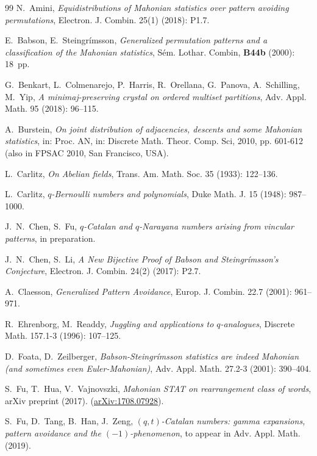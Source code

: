 \documentclass[12pt]{amsart}
\numberwithin{equation}{section}
\theoremstyle{plain}
\theoremstyle{definition}
\begin{document}
\begin{thebibliography}{99}
N.~Amini, \emph{Equidistributions of Mahonian statistics over pattern avoiding permutations}, Electron. J. Combin. 25(1) (2018): P1.7.

E.~Babson, E.~Steingr\'{i}msson, \emph{Generalized permutation patterns and a classification of the Mahonian statistics}, S\'{e}m. Lothar. Combin, {\bf B44b} (2000): 18~pp.

 G.~Benkart, L.~Colmenarejo, P.~Harris, R.~Orellana, G.~Panova, A.~Schilling, M.~Yip, \emph{A minimaj-preserving crystal on ordered multiset partitions}, Adv. Appl. Math. 95 (2018): 96--115.

A.~Burstein, \emph{On joint distribution of adjacencies, descents and some Mahonian statistics}, in: Proc. AN, in: Discrete Math. Theor. Comp. Sci, 2010, pp. 601-612 (also in FPSAC 2010, San Francisco, USA).

L.~Carlitz, \emph{On Abelian fields}, Trans. Am. Math. Soc. 35 (1933): 122--136.

L.~Carlitz, \emph{$q$-Bernoulli numbers and polynomials}, Duke Math. J. 15 (1948): 987--1000.

J.~N.~Chen, S.~Fu, \emph{$q$-Catalan and $q$-Narayana numbers arising from vincular patterns}, in preparation.

J.~N.~Chen, S.~Li, \emph{A New Bijective Proof of Babson and Steingr\'{i}msson's Conjecture}, Electron. J. Combin. 24(2) (2017): P2.7.


A.~Claesson, \emph{Generalized Pattern Avoidance},
Europ. J. Combin. 22.7 (2001): 961--971.

R.~Ehrenborg, M.~Readdy, \emph{Juggling and applications to $q$-analogues}, Discrete Math. 157.1-3 (1996): 107--125.

D.~Foata, D.~Zeilberger, \emph{Babson-Steingr\'{i}msson statistics are indeed Mahonian (and sometimes even Euler-Mahonian)}, Adv. Appl. Math. 27.2-3 (2001): 390--404.

S.~Fu, T.~Hua, V.~Vajnovszki, \emph{Mahonian STAT on rearrangement class of words}, arXiv preprint (2017). (\href{http://arxiv.org/abs/1708.07928}{arXiv:1708.07928}).

S.~Fu, D.~Tang, B.~Han, J.~Zeng, \emph{$(q,t)$-Catalan numbers: gamma expansions, pattern avoidance and the $(-1)$-phenomenon}, to appear in Adv. Appl. Math. (2019).%


\end{thebibliography}
\end{document}
